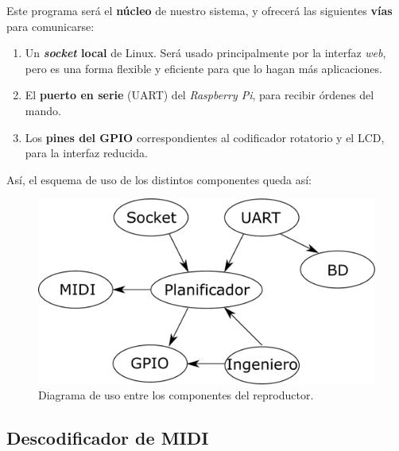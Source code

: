 Este programa será el \textbf{núcleo} de nuestro sistema, y ofrecerá las siguientes \textbf{vías} para comunicarse:

\begin{enumerate}
	\item Un \textbf{\textit{socket} local} de Linux. Será usado principalmente por la interfaz \textit{web}, pero es una forma flexible y eficiente para que lo hagan más aplicaciones.
	
	\item El \textbf{puerto en serie} (\acrshort{UART}) del \textit{Raspberry Pi}, para recibir órdenes del mando.
	
	\item Los \textbf{pines del \acrshort{GPIO}} correspondientes al codificador rotatorio y el \acrshort{LCD}, para la interfaz reducida.
\end{enumerate}

Así, el esquema de uso de los distintos componentes queda así:

\smallskip

\begin{figure}[H]
	\noindent \begin{centering}
		\includegraphics[width=\linewidth/2]{capitulo4/daemon}
		\par\end{centering}
	\smallskip
	\caption{\label{fig:daemon} Diagrama de uso entre los componentes del reproductor.}
\end{figure} 

\smallskip

\subsection{Descodificador de MIDI}
\label{subsec:daemon_midi}

